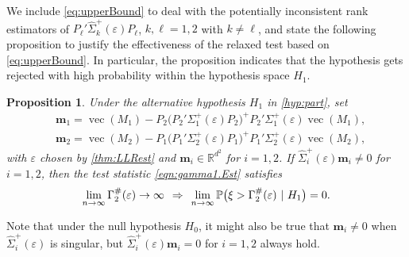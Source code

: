\documentclass[12pt]{article}
\numberwithin{equation}{section}
\numberwithin{table}{section}
\numberwithin{thm}{section}
\numberwithin{defn}{section}
\numberwithin{lem}{section}
\newtheorem{prop}{Proposition}
\numberwithin{prop}{section}
\numberwithin{cor}{section}
\numberwithin{rem}{section}
\DeclareMathOperator{\Vector}{vec}
\begin{document}
\begin{appendix}
We include \eqref{eq:upperBound} to deal with the potentially inconsistent rank estimators of $P_{\ell}' \widehat{\Sigma}_k^+(\varepsilon) P_{\ell}$, $k, \ell = 1,2$ with $k \neq \ell$, and state the following proposition to justify the effectiveness of the relaxed test based on \eqref{eq:upperBound}. In particular, the proposition indicates that the hypothesis gets rejected with high probability within the hypothesis space $H_{1}$.

\begin{prop}\label{prop:alt.behave}
Under the alternative hypothesis $H_1$ in \eqref{hyp:part}, set
\begin{align*}
	& \bm{m}_1 = \Vector (M_1) - P_2 \big(P_2' \Sigma_1^+(\varepsilon) P_2\big)^+ P_2' \Sigma_1^+(\varepsilon) \Vector(M_1),\\
	& \bm{m}_2 = \Vector (M_2) - P_1\big(P_1' \Sigma_2^+(\varepsilon) P_1\big)^+ P_1' \Sigma_2^+(\varepsilon) \Vector(M_2),
\end{align*}
with $\varepsilon$ chosen by \autoref{thm:LLRest} and $\bm{m}_i \in \mathbb{R}^{d^2}$ for $i = 1,2$. If $\widehat{\Sigma}_i^+(\varepsilon) \bm{m}_i \neq 0$ for $i = 1,2$, then the test statistic \eqref{eqn:gamma1.Est} satisfies
$$
\lim_{n \to \infty} \Gamma_2^\#(\varepsilon) \to \infty \hspace{0.15cm} \Rightarrow \hspace{0.15cm} \lim_{n \to \infty} \mathbb{P} \big( \xi > \Gamma_2^\#(\varepsilon) ~|~ H_1\big) = 0.
$$
\end{prop}

Note that under the null hypothesis $H_0$, it might also be true that $\bm{m}_i \neq 0$ when $\widehat{\Sigma}_i^+(\varepsilon)$ is singular, but $\widehat{\Sigma}_i^+(\varepsilon) \bm{m}_i = 0$ for $i = 1,2$ always hold.




\end{appendix}
\end{document}
